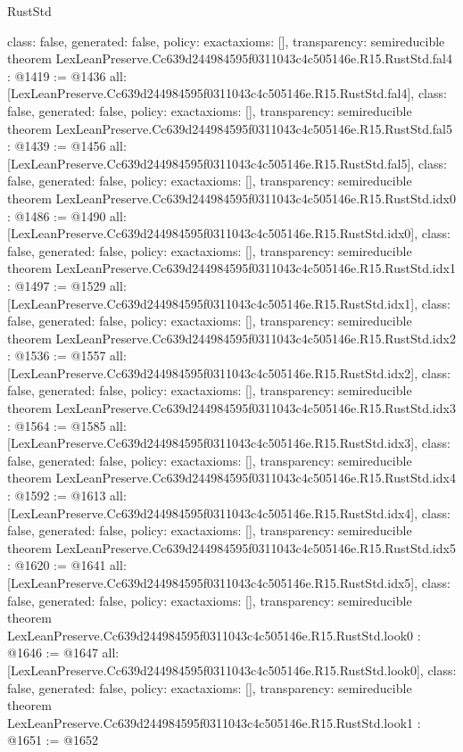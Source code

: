 \begin{lexlean}{RustStd}
\begin{coremodule}
{  class: false,
  generated: false,
  policy: exact{axioms: []},
  transparency: semireducible
}
theorem LexLeanPreserve.Cc639d244984595f0311043c4c505146e.R15.RustStd.fal4 : @1419 := @1436 {
  all: [LexLeanPreserve.Cc639d244984595f0311043c4c505146e.R15.RustStd.fal4],
  class: false,
  generated: false,
  policy: exact{axioms: []},
  transparency: semireducible
}
theorem LexLeanPreserve.Cc639d244984595f0311043c4c505146e.R15.RustStd.fal5 : @1439 := @1456 {
  all: [LexLeanPreserve.Cc639d244984595f0311043c4c505146e.R15.RustStd.fal5],
  class: false,
  generated: false,
  policy: exact{axioms: []},
  transparency: semireducible
}
theorem LexLeanPreserve.Cc639d244984595f0311043c4c505146e.R15.RustStd.idx0 : @1486 := @1490 {
  all: [LexLeanPreserve.Cc639d244984595f0311043c4c505146e.R15.RustStd.idx0],
  class: false,
  generated: false,
  policy: exact{axioms: []},
  transparency: semireducible
}
theorem LexLeanPreserve.Cc639d244984595f0311043c4c505146e.R15.RustStd.idx1 : @1497 := @1529 {
  all: [LexLeanPreserve.Cc639d244984595f0311043c4c505146e.R15.RustStd.idx1],
  class: false,
  generated: false,
  policy: exact{axioms: []},
  transparency: semireducible
}
theorem LexLeanPreserve.Cc639d244984595f0311043c4c505146e.R15.RustStd.idx2 : @1536 := @1557 {
  all: [LexLeanPreserve.Cc639d244984595f0311043c4c505146e.R15.RustStd.idx2],
  class: false,
  generated: false,
  policy: exact{axioms: []},
  transparency: semireducible
}
theorem LexLeanPreserve.Cc639d244984595f0311043c4c505146e.R15.RustStd.idx3 : @1564 := @1585 {
  all: [LexLeanPreserve.Cc639d244984595f0311043c4c505146e.R15.RustStd.idx3],
  class: false,
  generated: false,
  policy: exact{axioms: []},
  transparency: semireducible
}
theorem LexLeanPreserve.Cc639d244984595f0311043c4c505146e.R15.RustStd.idx4 : @1592 := @1613 {
  all: [LexLeanPreserve.Cc639d244984595f0311043c4c505146e.R15.RustStd.idx4],
  class: false,
  generated: false,
  policy: exact{axioms: []},
  transparency: semireducible
}
theorem LexLeanPreserve.Cc639d244984595f0311043c4c505146e.R15.RustStd.idx5 : @1620 := @1641 {
  all: [LexLeanPreserve.Cc639d244984595f0311043c4c505146e.R15.RustStd.idx5],
  class: false,
  generated: false,
  policy: exact{axioms: []},
  transparency: semireducible
}
theorem LexLeanPreserve.Cc639d244984595f0311043c4c505146e.R15.RustStd.look0 : @1646 := @1647 {
  all: [LexLeanPreserve.Cc639d244984595f0311043c4c505146e.R15.RustStd.look0],
  class: false,
  generated: false,
  policy: exact{axioms: []},
  transparency: semireducible
}
theorem LexLeanPreserve.Cc639d244984595f0311043c4c505146e.R15.RustStd.look1 : @1651 := @1652 {
}
\end{coremodule}
\end{lexlean}

